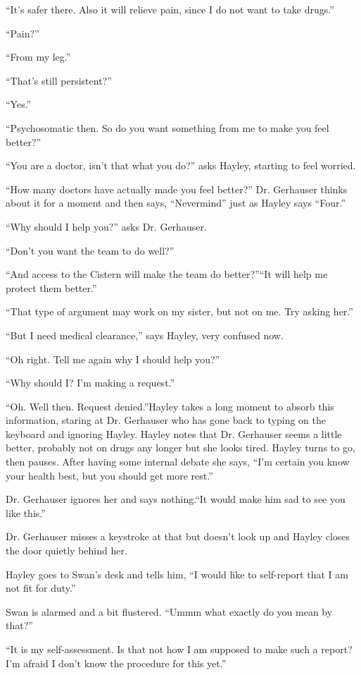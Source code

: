 ``It's safer there.  Also it will relieve pain, since I do not want to take drugs.''

``Pain?''

``From my leg.''

``That's still persistent?''

``Yes.''

``Psychosomatic then.  So do you want something from me to make you feel better?''

``You are a doctor, isn't that what you do?'' asks Hayley, starting to feel worried.

``How many doctors have actually made you feel better?''  Dr. Gerhauser thinks about it for a moment and then says, ``Nevermind'' just as Hayley says ``Four.''

``Why should I help you?'' asks Dr. Gerhauser.

``Don't you want the team to do well?''

``And access to the Cistern will make the team do better?''``It will help me protect them better.''

``That type of argument may work on my sister, but not on me.  Try asking her.''

``But I need medical clearance,'' says Hayley, very confused now.

``Oh right.  Tell me again why I should help you?''

``Why should I?  I'm making a request.''

``Oh.  Well then.  Request denied.''Hayley takes a long moment to absorb this information, staring at Dr. Gerhauser who has gone back to typing on the keyboard and ignoring Hayley.  Hayley notes that Dr. Gerhauser seems a little better, probably not on drugs any longer but she looks tired.  Hayley turns to go, then pauses.  After having some internal debate she says, ``I'm certain you know your health best, but you should get more rest.''

Dr. Gerhauser ignores her and says nothing.``It would make him sad to see you like this.''

Dr. Gerhauser misses a keystroke at that but doesn't look up and Hayley closes the door quietly behind her.



Hayley goes to Swan's desk and tells him, ``I would like to self-report that I am not fit for duty.''

Swan is alarmed and a bit flustered.  ``Ummm what exactly do you mean by that?''

``It is my self-assessment.  Is that not how I am supposed to make such a report?  I'm afraid I don't know the procedure for this yet.''

